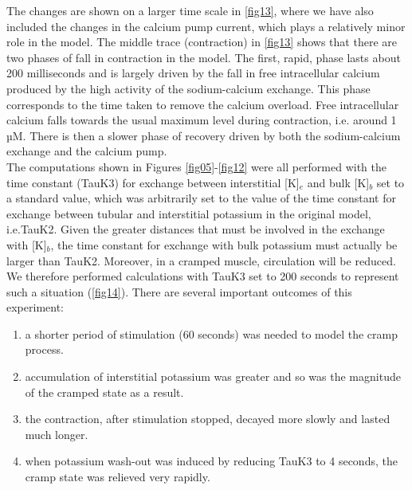 \documentclass[fleqn,10pt]{physiome}
\begin{document}
The changes are shown on a larger time scale in \autoref{fig13}, where we have also included the changes in the calcium pump current, which plays a relatively minor role in the model. The middle trace (contraction) in \autoref{fig13} shows that there are two phases of fall in contraction in the model. The first, rapid, phase lasts about 200 milliseconds and is largely driven by the fall in free intracellular calcium produced by the high activity of the sodium-calcium exchange. This phase corresponds to the time taken to remove the calcium overload. Free intracellular calcium falls towards the usual maximum level during contraction, i.e. around 1 µM.  There is then a slower phase of recovery driven by both the sodium-calcium exchange and the calcium pump.\\\newline
The computations shown in Figures \ref{fig05}-\ref{fig12} were all performed with the time constant (TauK3) for exchange between interstitial [K]$_e$ and bulk [K]$_b$ set to a standard value, which was arbitrarily set to the value of the time constant for exchange between tubular and interstitial potassium in the original \citep{shorten2007mathematical} model, i.e.TauK2. Given the greater distances that must be involved in the exchange with [K]$_b$, the time constant for exchange with bulk potassium must actually be larger than TauK2. Moreover, in a cramped muscle, circulation will be reduced. We therefore performed calculations with TauK3 set to 200 seconds to represent such a situation (\autoref{fig14}). There are several important outcomes of this experiment:
\renewcommand{\labelenumi}{(\alph{enumi})}
\begin{enumerate}
     \item a shorter period of stimulation (60 seconds) was needed to model the cramp process.
     \item accumulation of interstitial potassium was greater and so was the magnitude of the cramped state as a result.
     \item the contraction, after stimulation stopped, decayed more slowly and lasted much longer.
     \item when potassium wash-out was induced by reducing TauK3 to 4 seconds, the cramp state was relieved very rapidly. 
\end{enumerate}\newline
\end{document}
